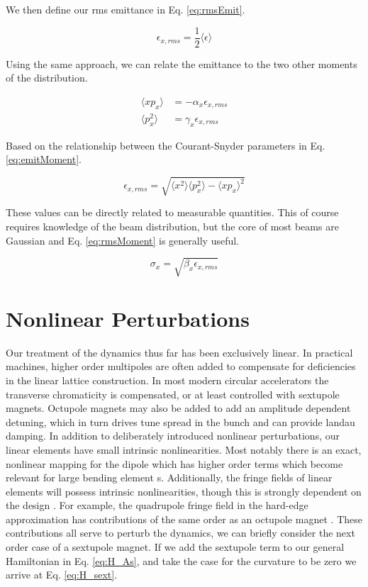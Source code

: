 We then define our rms emittance in Eq. \ref{eq:rmsEmit}. 

\begin{equation} \label{eq:rmsEmit}
	\epsilon_{x,rms} = \frac{1}{2} \langle \epsilon \rangle
\end{equation}

Using the same approach, we can relate the emittance to the two other moments of the distribution.

\begin{equation} \label{eq:momP2}
\begin{split}
	\langle x p_x \rangle &= -\alpha_x \epsilon_{x,rms}\\
	\langle p_x^2 \rangle &= \gamma_x \epsilon_{x,rms}
\end{split}
\end{equation}

Based on the relationship between the Courant-Snyder parameters in Eq. \ref{eq:emitMoment}.

\begin{equation} \label{eq:emitMoment}
	\epsilon_{x,rms} = \sqrt{\langle x^2 \rangle \langle p_x^2 \rangle - \langle x p_x \rangle^2}
\end{equation}

These values can be directly related to measurable quantities. This of course requires knowledge of the beam distribution, but the core of most beams are Gaussian and Eq. \ref{eq:rmsMoment} is generally useful.

\begin{equation} \label{eq:rmsMoment}
	\sigma_x = \sqrt{\beta_x \epsilon_{x,rms}}
\end{equation}

\section{Nonlinear Perturbations} \label{sec:nonlinearPerturb}
Our treatment of the dynamics thus far has been exclusively linear. In practical machines, higher order multipoles are often added to compensate for deficiencies in the linear lattice construction. In most modern circular accelerators the transverse chromaticity is compensated, or at least controlled with sextupole magnets. Octupole magnets may also be added to add an amplitude dependent detuning, which in turn drives tune spread in the bunch and can provide landau damping. In addition to deliberately introduced nonlinear perturbations, our linear elements have small intrinsic nonlinearities. Most notably there is an exact, nonlinear mapping for the dipole which has higher order terms which become relevant for large bending element \cite{ExactSbend}s. Additionally, the fringe fields of linear elements will possess intrinsic nonlinearities, though this is strongly dependent on the design \cite{Baartman}. For example, the quadrupole fringe field in the hard-edge approximation has contributions of the same order as an octupole magnet \cite{Forrest}. These contributions all serve to perturb the dynamics, we can briefly consider the next order case of a sextupole magnet. If we add the sextupole term to our general Hamiltonian in Eq. \ref{eq:H_As}, and take the case for the curvature to be zero we arrive at Eq. \ref{eq:H_sext}.

